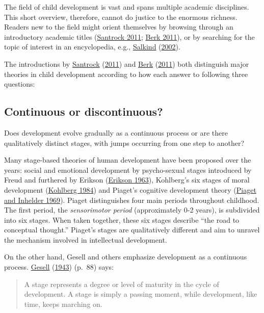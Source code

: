 \documentclass[
]{book}
\begin{document}
The field of child development is vast and spans multiple academic disciplines. This short overview, therefore, cannot do justice to the enormous richness. Readers new to the field might orient themselves by browsing through an introductory academic titles (\protect\hyperlink{ref-santrock2010}{Santrock 2011}; \protect\hyperlink{ref-berk2013}{Berk 2011}), or by searching for the topic of interest in an encyclopedia, e.g., \protect\hyperlink{ref-salkind2002}{Salkind} (\protect\hyperlink{ref-salkind2002}{2002}).

The introductions by \protect\hyperlink{ref-santrock2010}{Santrock} (\protect\hyperlink{ref-santrock2010}{2011}) and \protect\hyperlink{ref-berk2013}{Berk} (\protect\hyperlink{ref-berk2013}{2011}) both distinguish major theories in child development according to how each answer to following three questions:

\hypertarget{continuous-or-discontinuous}{%
\subsection{Continuous or discontinuous?}\label{continuous-or-discontinuous}}

Does development evolve gradually as a continuous process or are there qualitatively distinct stages, with jumps occurring from one step to another?

Many stage-based theories of human development have been proposed over the years: social and emotional development by psycho-sexual stages introduced by Freud and furthered by Erikson (\protect\hyperlink{ref-erikson1963}{Erikson 1963}), Kohlberg's six stages of moral development (\protect\hyperlink{ref-kohlberg1984}{Kohlberg 1984}) and Piaget's cognitive development theory (\protect\hyperlink{ref-piaget1969}{Piaget and Inhelder 1969}). Piaget distinguishes four main periods throughout childhood. The first period, the \emph{sensorimotor period} (approximately 0-2 years), is subdivided into six stages. When taken together, these six stages describe ``the road to conceptual thought.'' Piaget's stages are qualitatively different and aim to unravel the mechanism involved in intellectual development.

On the other hand, Gesell and others emphasize development as a continuous process. \protect\hyperlink{ref-gesell1943}{Gesell} (\protect\hyperlink{ref-gesell1943}{1943}) (p.~88) says:

\begin{quote}
A stage represents a degree or level of maturity in the cycle of development. A stage is simply a passing moment, while development, like time, keeps marching on.
\end{quote}
\end{document}

